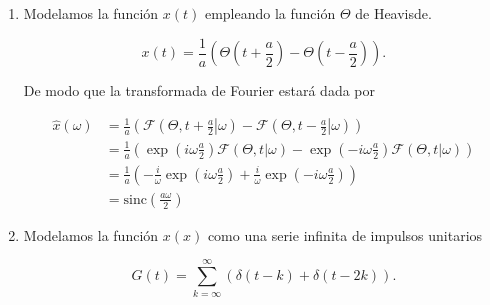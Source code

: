 \documentclass[a4paper,12pt,final]{article}
\begin{document}
      \begin{enumerate}[label=\alph*)]
        \item Modelamos la función $x\left(t\right)$ empleando la función
          $\Theta$ de Heavisde.

          \begin{equation*}
            x\left(t\right) = \frac{1}{a}\left(
                                \Theta\left(t + \frac{a}{2}\right) -
                                \Theta\left(t - \frac{a}{2}\right)
                              \right).
          \end{equation*}

          \noindent De modo que la transformada de Fourier estará dada por

          \begin{equation*}
            \begin{split}
              \widehat{x}\left(\omega\right) & = \frac{1}{a}\left(
                                                   \mathcal{F}\left(\Theta,\left.t + \frac{a}{2}\right|\omega\right) -
                                                   \mathcal{F}\left(\Theta,\left.t - \frac{a}{2}\right|\omega\right)
                                                 \right) \\
                                             & = \frac{1}{a}\left(
                                                   \exp\left( i\omega\frac{a}{2}\right)\mathcal{F}\left(\Theta,t|\omega\right) -
                                                   \exp\left(-i\omega\frac{a}{2}\right)\mathcal{F}\left(\Theta,t|\omega\right)
                                                 \right) \\
                                             & = \frac{1}{a}\left(
                                                   -\frac{i}{\omega}\exp\left( i\omega\frac{a}{2}\right)
                                                   +\frac{i}{\omega}\exp\left(-i\omega\frac{a}{2}\right)
                                                 \right) \\
                                             & = \mathrm{sinc}\left(\frac{a\omega}{2}\right)
            \end{split}
          \end{equation*}

        \item Modelamos la función $x\left(x\right)$ como una serie infinita de
          impulsos unitarios

          \begin{equation*}
            G\left(t\right) = \sum_{k=\infty}^{\infty}\left(
                                \delta\left(t -   k\right) +
                                \delta\left(t - 2 k\right)
                              \right).
          \end{equation*}


\end{enumerate}
\end{document}
